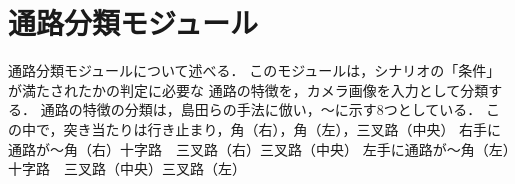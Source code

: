 \section{通路分類モジュール}
通路分類モジュールについて述べる．
このモジュールは，シナリオの「条件」が満たされたかの判定に必要な
通路の特徴を，カメラ画像を入力として分類する．
通路の特徴の分類は，島田らの手法に倣い，〜に示す8つとしている．
この中で，突き当たりは行き止まり，角（右），角（左），三叉路（中央）
右手に通路が〜角（右）十字路　三叉路（右）三叉路（中央）
左手に通路が〜角（左）十字路　三叉路（中央）三叉路（左）